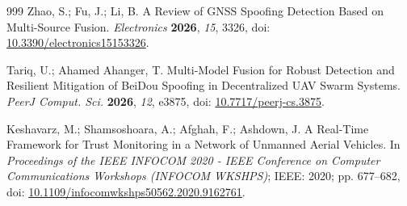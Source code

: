 \documentclass[notspecified,article,submit,moreauthors]{Definitions/mdpi}
\begin{document}
\begin{thebibliography}{999}
Zhao, S.; Fu, J.; Li, B. A Review of GNSS Spoofing Detection Based on Multi-Source Fusion. {\em Electronics} {\bf 2026}, {\em 15}, 3326, doi: \href{https://doi.org/10.3390/electronics15153326}{10.3390/electronics15153326}.

Tariq, U.; Ahamed Ahanger, T. Multi-Model Fusion for Robust Detection and Resilient Mitigation of BeiDou Spoofing in Decentralized UAV Swarm Systems. {\em PeerJ Comput. Sci.} {\bf 2026}, {\em 12}, e3875, doi: \href{https://doi.org/10.7717/peerj-cs.3875}{10.7717/peerj-cs.3875}.

Keshavarz, M.; Shamsoshoara, A.; Afghah, F.; Ashdown, J. A Real-Time Framework for Trust Monitoring in a Network of Unmanned Aerial Vehicles. In {\em Proceedings of the IEEE INFOCOM 2020 - IEEE Conference on Computer Communications Workshops (INFOCOM WKSHPS)}; IEEE: 2020; pp. 677--682, doi: \href{https://doi.org/10.1109/infocomwkshps50562.2020.9162761}{10.1109/infocomwkshps50562.2020.9162761}.

\end{thebibliography}
\end{document}
